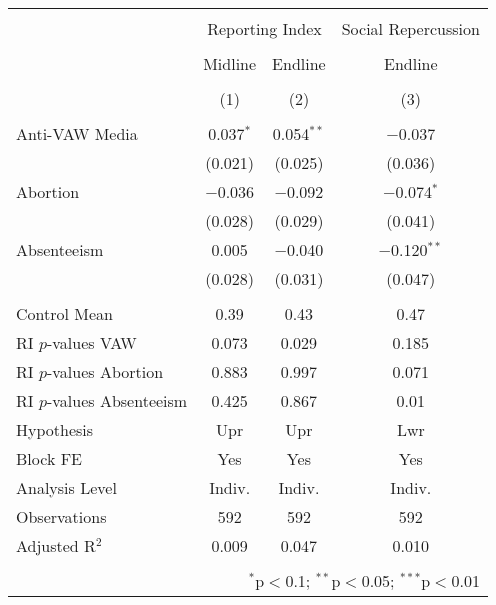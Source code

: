 
\begin{tabular}{@{\extracolsep{5pt}}lccc} 
\\[-1.8ex]\hline 
\hline \\[-1.8ex] 
 & \multicolumn{2}{c}{Reporting Index} & Social Repercussion \\ 
\\[-1.8ex] & Midline & Endline & Endline \\ 
\\[-1.8ex] & (1) & (2) & (3)\\ 
\hline \\[-1.8ex] 
 Anti-VAW Media & 0.037$^{*}$ & 0.054$^{**}$ & $-$0.037 \\ 
  & (0.021) & (0.025) & (0.036) \\ 
  Abortion & $-$0.036 & $-$0.092 & $-$0.074$^{*}$ \\ 
  & (0.028) & (0.029) & (0.041) \\ 
  Absenteeism & 0.005 & $-$0.040 & $-$0.120$^{**}$ \\ 
  & (0.028) & (0.031) & (0.047) \\ 
 \hline \\[-1.8ex] 
Control Mean & 0.39 & 0.43 & 0.47 \\ 
RI $p$-values VAW & 0.073 & 0.029 & 0.185 \\ 
RI $p$-values Abortion & 0.883 & 0.997 & 0.071 \\ 
RI $p$-values Absenteeism & 0.425 & 0.867 & 0.01 \\ 
Hypothesis & Upr & Upr & Lwr \\ 
Block FE & Yes & Yes & Yes \\ 
Analysis Level & Indiv. & Indiv. & Indiv. \\ 
Observations & 592 & 592 & 592 \\ 
Adjusted R$^{2}$ & 0.009 & 0.047 & 0.010 \\ 
\hline 
\hline \\[-1.8ex] 
\multicolumn{4}{r}{$^{*}$p$<$0.1; $^{**}$p$<$0.05; $^{***}$p$<$0.01} \\ 
\end{tabular} 
